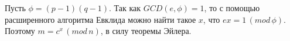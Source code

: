 Пусть $\phi = (p - 1)(q - 1)$. Так как $GCD(e, \phi) = 1$,
то с помощью расширенного алгоритма Евклида
можно найти такое $x$, что $ex = 1\,(mod \, \phi)$.
Поэтому $m = c^x \,(mod \, n)$, в силу теоремы Эйлера.
